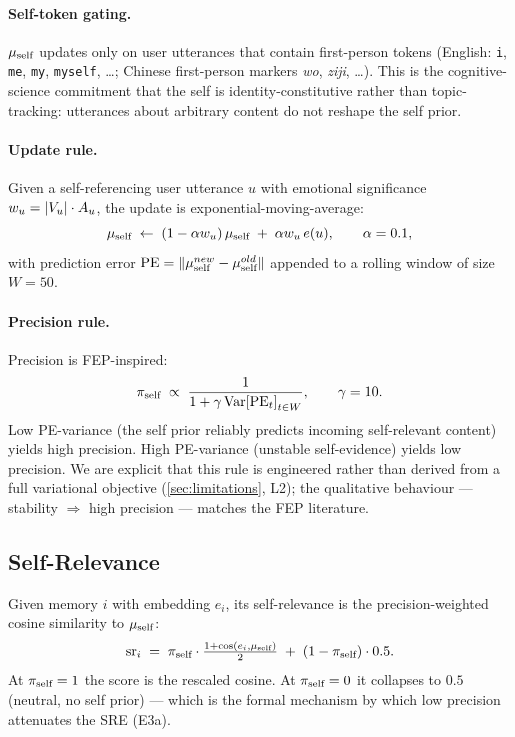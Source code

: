 \paragraph{Self-token gating.}
$\mu_{\text{self}}$ updates only on user utterances that contain first-person
tokens (English: \texttt{i}, \texttt{me}, \texttt{my}, \texttt{myself},
\dots; Chinese first-person markers \emph{wo}, \emph{ziji}, \dots).
This is the cognitive-science commitment that the self is
identity-constitutive rather than topic-tracking: utterances about
arbitrary content do not reshape the self prior.

\paragraph{Update rule.}
Given a self-referencing user utterance $u$ with emotional significance
$w_u = |V_u|\cdot A_u$, the update is exponential-moving-average:
\begin{equation}
\mu_{\text{self}} \;\leftarrow\;
(1 - \alpha w_u)\,\mu_{\text{self}} \;+\; \alpha w_u\,e(u),
\qquad \alpha = 0.1,
\end{equation}
with prediction error $\mathrm{PE} = \lVert\mu_{\text{self}}^{new}-\mu_{\text{self}}^{old}\rVert$
appended to a rolling window of size $W{=}50$.

\paragraph{Precision rule.}
Precision is FEP-inspired:
\begin{equation}
\label{eq:pi}
\pi_{\text{self}} \;\propto\;
\frac{1}{1 + \gamma\,\mathrm{Var}\!\left[\mathrm{PE}_t\right]_{t\in W}},
\qquad \gamma=10.
\end{equation}
Low PE-variance (the self prior reliably predicts incoming
self-relevant content) yields high precision. High PE-variance (unstable
self-evidence) yields low precision. We are explicit that this rule is
engineered rather than derived from a full variational objective
(\cref{sec:limitations}, L2); the qualitative behaviour --- stability
$\Rightarrow$ high precision --- matches the FEP literature.

\subsection{Self-Relevance}

Given memory $i$ with embedding $e_i$, its self-relevance is the
precision-weighted cosine similarity to $\mu_{\text{self}}$:
\begin{equation}
\label{eq:sr}
\mathrm{sr}_i \;=\;
\pi_{\text{self}} \cdot \tfrac{1 + \cos(e_i,\mu_{\text{self}})}{2}
\;+\;
(1 - \pi_{\text{self}})\cdot 0.5.
\end{equation}
At $\pi_{\text{self}} = 1$ the score is the rescaled cosine. At $\pi_{\text{self}} = 0$ it
collapses to $0.5$ (neutral, no self prior) --- which is the formal
mechanism by which low precision attenuates the SRE (E3a).

